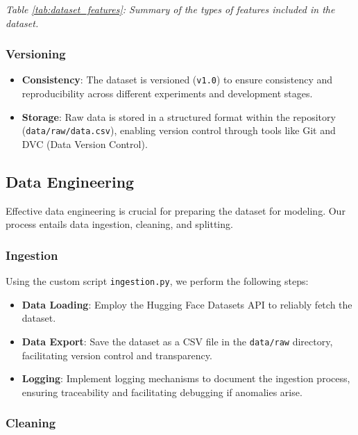 \documentclass{article}
\begin{document}
\textit{Table \ref{tab:dataset_features}: Summary of the types of features included in the dataset.}

\subsubsection{Versioning}

\begin{itemize}[leftmargin=*]
    \item \textbf{Consistency}: The dataset is versioned (\texttt{v1.0}) to ensure consistency and reproducibility across different experiments and development stages.
    \item \textbf{Storage}: Raw data is stored in a structured format within the repository (\texttt{data/raw/data.csv}), enabling version control through tools like Git and DVC (Data Version Control).
\end{itemize}

\subsection{Data Engineering}

Effective data engineering is crucial for preparing the dataset for modeling. Our process entails data ingestion, cleaning, and splitting.

\subsubsection{Ingestion}

Using the custom script \texttt{ingestion.py}, we perform the following steps:

\begin{itemize}[leftmargin=*]
    \item \textbf{Data Loading}: Employ the Hugging Face Datasets API to reliably fetch the dataset.
    \item \textbf{Data Export}: Save the dataset as a CSV file in the \texttt{data/raw} directory, facilitating version control and transparency.
    \item \textbf{Logging}: Implement logging mechanisms to document the ingestion process, ensuring traceability and facilitating debugging if anomalies arise.
\end{itemize}

\subsubsection{Cleaning}
\end{document}
